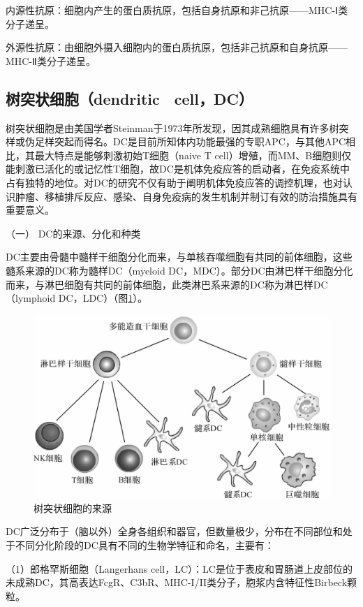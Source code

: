 内源性抗原：细胞内产生的蛋白质抗原，包括自身抗原和非己抗原------MHC-Ⅰ类分子递呈。

外源性抗原：由细胞外摄入细胞内的蛋白质抗原，包括非己抗原和自身抗原------MHC-Ⅱ类分子递呈。


\subsection{树突状细胞（dendritic　cell，DC）}

树突状细胞是由美国学者Steinman于1973年所发现，因其成熟细胞具有许多树突样或伪足样突起而得名。DC是目前所知体内功能最强的专职APC，与其他APC相比，其最大特点是能够刺激初始T细胞（naive
T
cell）增殖，而MM、B细胞则仅能刺激已活化的或记忆性T细胞，故DC是机体免疫应答的启动者，在免疫系统中占有独特的地位。对DC的研究不仅有助于阐明机体免疫应答的调控机理，也对认识肿瘤、移植排斥反应、感染、自身免疫病的发生机制并制订有效的防治措施具有重要意义。

（一） DC的来源、分化和种类

DC主要由骨髓中髓样干细胞分化而来，与单核吞噬细胞有共同的前体细胞，这些髓系来源的DC称为髓样DC（myeloid
DC，MDC）。部分DC由淋巴样干细胞分化而来，与淋巴细胞有共同的前体细胞，此类淋巴系来源的DC称为淋巴样DC（lymphoid
DC，LDC）（图\ref{fig9-3}）。

\begin{figure}[!htbp]
 \centering
 \includegraphics{./images/Image00129.jpg}
 \captionsetup{justification=centering}
 \caption{树突状细胞的来源}
 \label{fig9-3}
  \end{figure} 

DC广泛分布于（脑以外）全身各组织和器官，但数量极少，分布在不同部位和处于不同分化阶段的DC具有不同的生物学特征和命名，主要有：

（1）郎格罕斯细胞（Langerhans
cell，LC）：LC是位于表皮和胃肠道上皮部位的未成熟DC，其高表达FcgR、C3bR、MHC-I/II类分子，胞浆内含特征性Birbeck颗粒。

